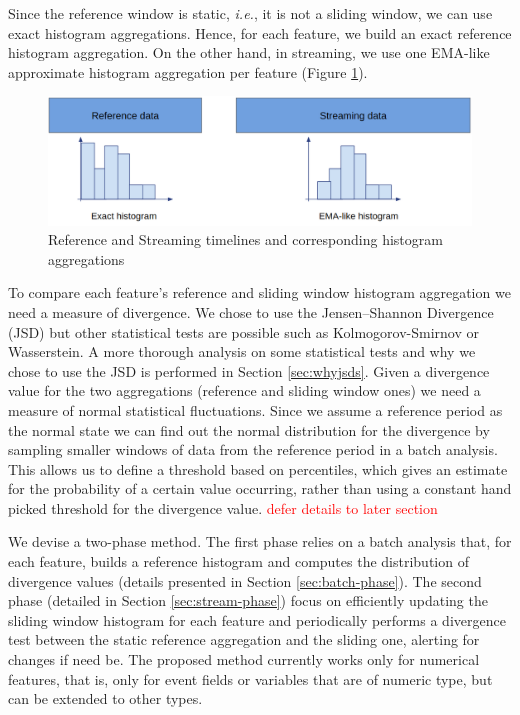 Since the reference window is static, \textit{i.e.}, it is not a sliding window, we can use exact histogram aggregations. Hence, for each feature, we build an exact reference histogram aggregation. On the other hand, in streaming, we use one EMA-like approximate histogram aggregation per feature (Figure \ref{fig:timelines-hists}).


\begin{figure}[!htb]
    \begin{center}
      \includegraphics[scale=0.4]{figures/timelines-hists.png}
      \caption[]{Reference and Streaming timelines and corresponding histogram aggregations}
      \label{fig:timelines-hists}
    \end{center}
\end{figure}


To compare each feature's reference and sliding window histogram aggregation we need a measure of divergence. We chose to use the Jensen–Shannon Divergence (JSD) \cite{JSD} but other statistical tests are possible such as Kolmogorov-Smirnov or Wasserstein. A more thorough analysis on some statistical tests and why we chose to use the JSD is performed in Section \ref{sec:whyjsds}. Given a divergence value for the two aggregations (reference and sliding window ones) we need a measure of normal statistical fluctuations. Since we assume a reference period as the normal state we can find out the normal distribution for the divergence by sampling smaller windows of data from the reference period in a batch analysis. This allows us to define a threshold based on percentiles, which gives an estimate for the probability of a certain value occurring, rather than using a constant hand picked threshold for the divergence value. \textcolor{red}{defer details to later section}


We devise a two-phase method. The first phase relies on a batch analysis that, for each feature, builds a reference histogram and computes the distribution of divergence values (details presented in Section \ref{sec:batch-phase}). The second phase (detailed in Section \ref{sec:stream-phase}) focus on efficiently updating the sliding window histogram for each feature and periodically performs a divergence test between the static reference aggregation and the sliding one, alerting for changes if need be. The proposed method currently works only for numerical features, that is, only for event fields or variables that are of numeric type, but can be extended to other types.


